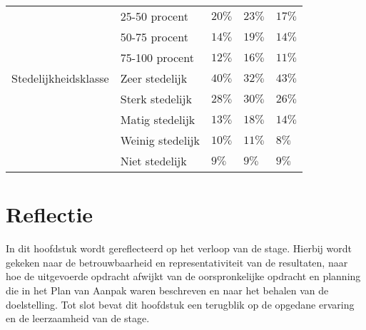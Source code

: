 \documentclass[12pt, letterpaper]{article}
\begin{document}
\begin{appendices}
\begin{table}[H]
\begin{center}
{\begin{tabular}{|R{2.5cm}|R{3.5 cm}||C{2cm}|C{2cm}|C{2cm}|}
                \rule{0pt}{11pt}
                & 25-50 procent & $20\%$ & $23\%$ & $17\%$ \\
                \rule{0pt}{11pt}
                & 50-75 procent  & $14\%$ & $19\%$ & $14\%$\\
                \rule{0pt}{11pt}
                & 75-100 procent & $12\%$ & $16\%$ & $11\%$ \\ 
                \hline 
                \rule{0pt}{5pt}
                Stedelijkheidsklasse & Zeer stedelijk & $40\%$ & $32\%$ & $43\%$ \\ 
                \rule{0pt}{11pt}
                & Sterk stedelijk & $28\%$ & $30\%$ & $26\%$ \\ 
                \rule{0pt}{11pt}
                & Matig stedelijk & $13\%$ & $18\%$ & $14\%$ \\ 
                \rule{0pt}{11pt}
                & Weinig stedelijk & $10\%$ & $11\%$ & $8\%$ \\
                \rule{0pt}{11pt}
                & Niet stedelijk & $9\%$ & $9\%$ & $9\%$ \\
                \hline  
            \end{tabular}
            \label{res02}
            }
    \end{center}
\end{table}

\newpage
\section{Reflectie} \label{reflect}
In dit hoofdstuk wordt gereflecteerd op het verloop van de stage. Hierbij wordt gekeken naar de betrouwbaarheid en representativiteit van de resultaten, naar hoe de uitgevoerde opdracht afwijkt van de oorspronkelijke opdracht en planning die in het Plan van Aanpak waren beschreven en naar het behalen van de doelstelling. Tot slot bevat dit hoofdstuk een terugblik op de opgedane ervaring en de leerzaamheid van de stage.


\end{appendices}
\end{document}
